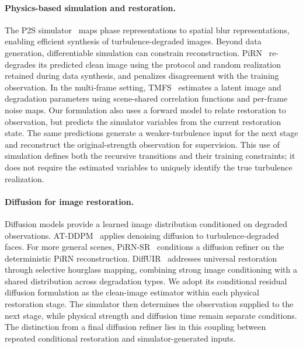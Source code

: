 \paragraph{Physics-based simulation and restoration.}
The P2S simulator~\cite{mao2021p2s} maps phase representations to spatial blur representations, enabling efficient synthesis of turbulence-degraded images.
Beyond data generation, differentiable simulation can constrain reconstruction.
PiRN~\cite{jaiswal2023pirn} re-degrades its predicted clean image using the protocol and random realization retained during data synthesis, and penalizes disagreement with the training observation.
In the multi-frame setting, TMFS~\cite{xie2026tmfs} estimates a latent image and degradation parameters using scene-shared correlation functions and per-frame noise maps.
Our formulation also uses a forward model to relate restoration to observation, but predicts the simulator variables from the current restoration state.
The same predictions generate a weaker-turbulence input for the next stage and reconstruct the original-strength observation for supervision.
This use of simulation defines both the recursive transitions and their training constraints; it does not require the estimated variables to uniquely identify the true turbulence realization.

\paragraph{Diffusion for image restoration.}
Diffusion models provide a learned image distribution conditioned on degraded observations.
AT-DDPM~\cite{nair2023atddpm} applies denoising diffusion to turbulence-degraded faces.
For more general scenes, PiRN-SR~\cite{jaiswal2023pirn} conditions a diffusion refiner on the deterministic PiRN reconstruction.
DiffUIR~\cite{zheng2024diffuir} addresses universal restoration through selective hourglass mapping, combining strong image conditioning with a shared distribution across degradation types.
We adopt its conditional residual diffusion formulation as the clean-image estimator within each physical restoration stage.
The simulator then determines the observation supplied to the next stage, while physical strength and diffusion time remain separate conditions.
The distinction from a final diffusion refiner lies in this coupling between repeated conditional restoration and simulator-generated inputs.
